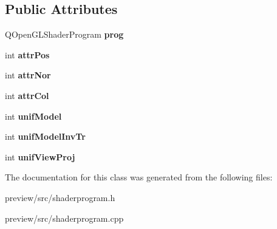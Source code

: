 \subsection*{Public Attributes}
\begin{DoxyCompactItemize}
\item 
\hypertarget{class_shader_program_a8094baff92b6752e555faf8e2948bdd8}{}Q\+Open\+G\+L\+Shader\+Program {\bfseries prog}\label{class_shader_program_a8094baff92b6752e555faf8e2948bdd8}

\item 
\hypertarget{class_shader_program_a1a272c0832383b6413bf81c076342f4a}{}int {\bfseries attr\+Pos}\label{class_shader_program_a1a272c0832383b6413bf81c076342f4a}

\item 
\hypertarget{class_shader_program_a069fb10108a7a8ca03efa3e3b668662c}{}int {\bfseries attr\+Nor}\label{class_shader_program_a069fb10108a7a8ca03efa3e3b668662c}

\item 
\hypertarget{class_shader_program_afe3f7e1e8b86490c008160b5b5d0d6db}{}int {\bfseries attr\+Col}\label{class_shader_program_afe3f7e1e8b86490c008160b5b5d0d6db}

\item 
\hypertarget{class_shader_program_a2ed5b05aea85814f83a10288267b32d3}{}int {\bfseries unif\+Model}\label{class_shader_program_a2ed5b05aea85814f83a10288267b32d3}

\item 
\hypertarget{class_shader_program_a77e360effc5a2200a7b345690886d263}{}int {\bfseries unif\+Model\+Inv\+Tr}\label{class_shader_program_a77e360effc5a2200a7b345690886d263}

\item 
\hypertarget{class_shader_program_a26586039967a3bb8a9ab06167ae31d14}{}int {\bfseries unif\+View\+Proj}\label{class_shader_program_a26586039967a3bb8a9ab06167ae31d14}

\end{DoxyCompactItemize}


The documentation for this class was generated from the following files\+:\begin{DoxyCompactItemize}
\item 
preview/src/shaderprogram.\+h\item 
preview/src/shaderprogram.\+cpp\end{DoxyCompactItemize}

